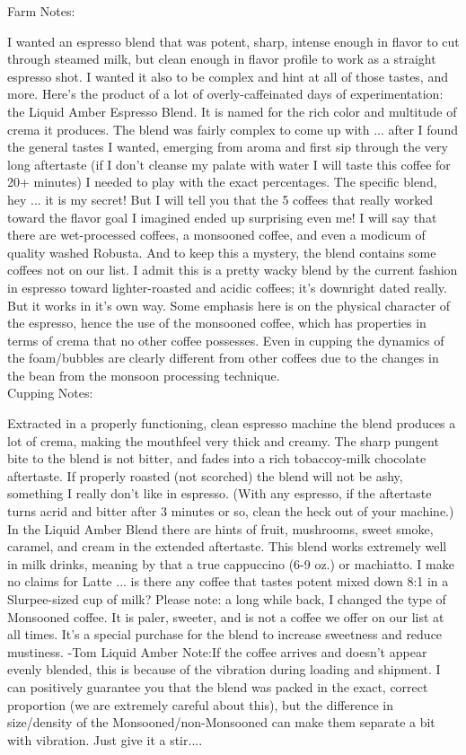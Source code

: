 \documentclass[10pt,twoside,footinclude=true,headinclude=true]{scrbook} %
\newlength{\mysize}
\newcommand{\myfontsize}[1]{
  \setlength{\mysize}{#1pt}
  \fontsize{\mysize}{1.2\mysize}
  \selectfont
}
\begin{document}
\newpage
\vspace*{-2.2em}
\linespread{1.2}
\raggedright
\normalsize
Farm Notes: \\
\myfontsize{8}
I wanted an espresso blend that was potent, sharp, intense enough in flavor to cut through steamed milk, but clean enough in flavor profile to work as a straight espresso shot. I wanted it also to be complex and hint at all of those tastes, and more. Here's the product of a lot of overly-caffeinated days of experimentation: the Liquid Amber Espresso Blend. It is named for the rich color and multitude of crema it produces. The blend was fairly complex to come up with ... after I found the general tastes I wanted, emerging from aroma and first sip through the very long aftertaste (if I don't cleanse my palate with water I will taste this coffee for 20+ minutes) I needed to play with the exact percentages. The specific blend, hey ... it is my secret! But I will tell you that the 5 coffees that really worked toward the flavor goal I imagined ended up surprising even me! I will say that there are wet-processed coffees, a monsooned coffee, and even a modicum of quality washed Robusta. And to keep this a mystery, the blend contains some coffees not on our list. I admit this is a pretty wacky blend by the current fashion in espresso toward lighter-roasted and acidic coffees; it's downright dated really. But it works in it's own way. Some emphasis here is on the physical character of the espresso, hence the use of the monsooned coffee, which has properties in terms of crema that no other coffee possesses. Even in cupping the dynamics of the foam/bubbles are clearly different from other coffees due to the changes in the bean from the monsoon processing technique. \\
\medskip
\normalsize
Cupping Notes: \\
\myfontsize{8}
Extracted in a properly functioning, clean espresso machine the blend produces a lot of crema, making the mouthfeel very thick and creamy. The sharp pungent bite to the blend is not bitter, and fades into a rich tobaccoy-milk chocolate aftertaste. If properly roasted (not scorched) the blend will not be ashy, something I really don't like in espresso. (With any espresso, if the aftertaste turns acrid and bitter after 3 minutes or so, clean the heck out of your machine.) In the Liquid Amber Blend there are hints of fruit, mushrooms, sweet smoke, caramel, and cream in the extended aftertaste. This blend works extremely well in milk drinks, meaning by that a true cappuccino (6-9 oz.) or machiatto. I make no claims for Latte ... is there any coffee that tastes potent mixed down 8:1 in a Slurpee-sized cup of milk? Please note: a long while back, I changed the type of Monsooned coffee. It is paler, sweeter, and is not a coffee we offer on our list at all times. It's a special purchase for the blend to increase sweetness and reduce mustiness. -Tom Liquid Amber Note:If the coffee arrives and doesn't appear evenly blended, this is because of the vibration during loading and shipment. I can positively guarantee you that the blend was packed in the exact, correct proportion (we are extremely careful about this), but the difference in size/density of the Monsooned/non-Monsooned can make them separate a bit with vibration. Just give it a stir.... \\
\end{document}

